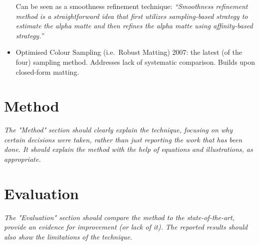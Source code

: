 \documentclass{article}
\begin{document}
\begin{multicols}{2}[]
\begin{itemize}
    Can be seen as a smoothness refinement technique: \emph{``Smoothness refinement method is a straightforward idea that first utilizes sampling-based strategy to estimate the alpha matte and then refines the alpha matte using affinity-based strategy.''}
    \item Optimised Colour Sampling (i.e.\ Robust Matting) 2007: the latest (of the four) sampling method.  Addresses lack of systematic comparison. Builds upon closed-form matting.
\end{itemize}




\section{Method}
\emph{The "Method" section should clearly explain the technique, focusing on why certain decisions were taken, rather than just reporting the work that has been done. It should explain the method with the help of equations and illustrations, as appropriate.}


\section{Evaluation}
\emph{The "Evaluation" section should compare the method to the state-of-the-art, provide an evidence for improvement (or lack of it). The reported results should also show the limitations of the technique.}



\end{multicols}
\end{document}
